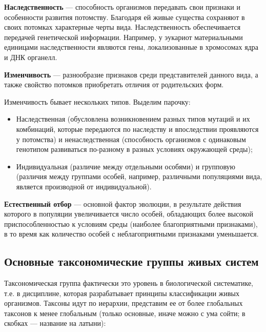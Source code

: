 \textbf{Наследственность} --- способность организмов передавать свои признаки и особенности развития потомству. Благодаря ей живые существа сохраняют в своих потомках характерные черты вида. Наследственность обеспечивается передачей генетической информации. Например, у эукариот материальными единицами наследственности являются гены, локализованные в хромосомах ядра и ДНК органелл.

\textbf{Изменчивость} --- разнообразие признаков среди представителей данного вида, а также свойство потомков приобретать отличия от родительских форм.

Изменчивость бывает нескольких типов. Выделим парочку:

\begin{itemize}
	\item Наследственная (обусловлена возникновением разных типов мутаций и их комбинаций, которые передаются по наследству и впоследствии проявляются у потомства) и ненаследственная (способность организмов с одинаковым генотипом развиваться по-разному в разных условиях окружающей среды);
	
	\item Индивидуальная (различие между отдельными особями) и групповую (различия между группами особей, например, различными популяциями вида, является производной от индивидуальной).
\end{itemize}

\textbf{Естественный отбор} --- основной фактор эволюции, в результате действия которого в популяции увеличивается число особей, обладающих более высокой приспособленностью к условиям среды (наиболее благоприятными признаками), в то время как количество особей с неблагоприятными признаками уменьшается.

\subsection{Основные таксономические группы живых систем}

Таксономическая группа фактически это уровень в биологической систематике, т.е. в дисциплине, которая разрабатывает принципы классификации живых организмов. Таксоны идут по иерархии, представим ее от более глобальных таксонов к менее глобальным (только основные, иначе можно с ума сойти; в скобках --- название на латыни):

